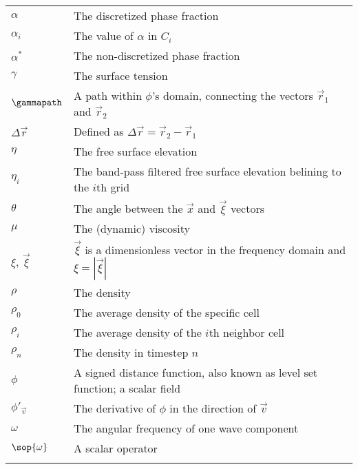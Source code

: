 \begin{center}
\begin{longtabu}{l X}
    $\alpha$            & The discretized phase fraction \\
    $\alpha_i$          & The value of $\alpha$ in $C_i$ \\
    $\alpha^*$          & The non-discretized phase fraction \\
    $\gamma$            & The surface tension \\
    $\gammapath$        & A path within $\phi$'s domain, connecting the vectors
                          $\vec{r}_1$ and $\vec{r}_2$ \\
    $\Delta\vec{r}$     & Defined as $\Delta\vec{r} = \vec{r}_2 - \vec{r}_1$ \\
    $\eta$              & The free surface elevation \\
    $\eta_i$            & The band-pass filtered free surface elevation belining to the $i$th grid \\
    $\theta$            & The angle between the $\vec{x}$ and $\vec{\xi}$ vectors \\
    $\mu$               & The (dynamic) viscosity \\
    $\xi,\,\vec{\xi}$   & $\vec{\xi}$ is a dimensionless vector in the frequency domain
                          and $\xi = |\vec{\xi}|$ \\
    $\rho$              & The density \\
    $\rho_0$            & The average density of the specific cell \\
    $\rho_i$            & The average density of the $i$th neighbor cell \\
    $\rho_n$            & The density in timestep $n$ \\
    $\phi$              & A signed distance function, also known as level set function;
                          a scalar field \\
    $\phi'_{\vec{v}}$   & The derivative of $\phi$ in the direction of $\vec{v}$ \\
    $\omega$            & The angular frequency of one wave component \\
    $\sop{\omega}$      & A scalar operator \\
    
    \\
    

\end{longtabu}
\end{center}
